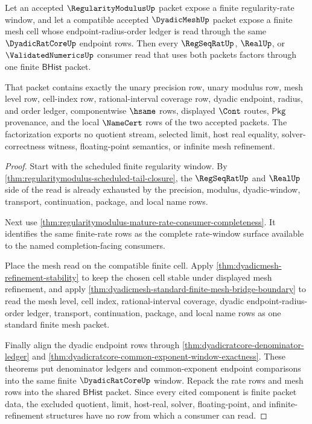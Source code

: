 \begin{theorem}
\label{thm:regularitymodulus-dyadicmesh-window-factorization}
Let an accepted $\RegularityModulusUp$ packet expose a finite regularity-rate
window, and let a compatible accepted $\DyadicMeshUp$ packet expose a finite
mesh cell whose endpoint-radius-order ledger is read through the same
$\DyadicRatCoreUp$ endpoint rows. Then every $\RegSeqRatUp$, $\RealUp$, or
$\ValidatedNumericsUp$ consumer read that uses both packets factors through
one finite $\mathsf{BHist}$ packet.

That packet contains exactly the unary precision row, unary modulus row, mesh
level row, cell-index row, rational-interval coverage row, dyadic endpoint,
radius, and order ledger, componentwise $\hsame$ rows, displayed $\Cont$
routes, $\mathsf{Pkg}$ provenance, and the local $\NameCert$ rows of the two
accepted packets. The factorization exports no quotient stream, selected
limit, host real equality, solver-correctness witness, floating-point
semantics, or infinite mesh refinement.
\end{theorem}
\begin{proof}
Start with the scheduled finite regularity window. By
\autoref{thm:regularitymodulus-scheduled-tail-closure}, the
$\RegSeqRatUp$ and $\RealUp$ side of the read is already exhausted by the
precision, modulus, dyadic-window, transport, continuation, package, and local
name rows.

Next use
\autoref{thm:regularitymodulus-mature-rate-consumer-completeness}. It identifies
the same finite-rate rows as the complete rate-window surface available to the
named completion-facing consumers.

Place the mesh read on the compatible finite cell. Apply
\autoref{thm:dyadicmesh-refinement-stability} to keep the chosen cell stable
under displayed mesh refinement, and apply
\autoref{thm:dyadicmesh-standard-finite-mesh-bridge-boundary} to read the mesh
level, cell index, rational-interval coverage, dyadic endpoint-radius-order
ledger, transport, continuation, package, and local name rows as one standard
finite mesh packet.

Finally align the dyadic endpoint rows through
\autoref{thm:dyadicratcore-denominator-ledger} and
\autoref{thm:dyadicratcore-common-exponent-window-exactness}. These theorems
put denominator ledgers and common-exponent endpoint comparisons into the same
finite $\DyadicRatCoreUp$ window. Repack the rate rows and mesh rows into the
shared $\mathsf{BHist}$ packet. Since every cited component is finite packet
data, the excluded quotient, limit, host-real, solver, floating-point, and
infinite-refinement structures have no row from which a consumer can read.
\end{proof}

